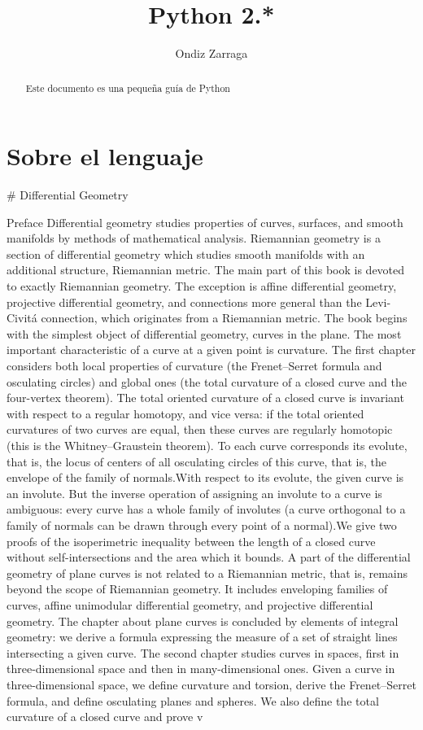 \documentclass[a4paper,10pt]{article}
\title{Python 2.*}
\author{Ondiz Zarraga}
\begin{document}
\maketitle

\begin{abstract}
Este documento es una pequeña guía de Python 
\end{abstract}

\tableofcontents

\section{Sobre el lenguaje}

# Differential Geometry

Preface
Differential geometry studies properties of curves, surfaces, and smooth manifolds
by methods of mathematical analysis. Riemannian geometry is a section of differential
geometry which studies smooth manifolds with an additional structure,
Riemannian metric. The main part of this book is devoted to exactly Riemannian
geometry. The exception is affine differential geometry, projective differential
geometry, and connections more general than the Levi-Civitá connection, which
originates from a Riemannian metric.
The book begins with the simplest object of differential geometry, curves in the
plane. The most important characteristic of a curve at a given point is curvature.
The first chapter considers both local properties of curvature (the Frenet–Serret
formula and osculating circles) and global ones (the total curvature of a closed
curve and the four-vertex theorem). The total oriented curvature of a closed curve
is invariant with respect to a regular homotopy, and vice versa: if the total oriented
curvatures of two curves are equal, then these curves are regularly homotopic (this
is the Whitney–Graustein theorem). To each curve corresponds its evolute, that is,
the locus of centers of all osculating circles of this curve, that is, the envelope of the
family of normals.With respect to its evolute, the given curve is an involute. But the
inverse operation of assigning an involute to a curve is ambiguous: every curve has
a whole family of involutes (a curve orthogonal to a family of normals can be drawn
through every point of a normal).We give two proofs of the isoperimetric inequality
between the length of a closed curve without self-intersections and the area which
it bounds. A part of the differential geometry of plane curves is not related to a
Riemannian metric, that is, remains beyond the scope of Riemannian geometry. It
includes enveloping families of curves, affine unimodular differential geometry, and
projective differential geometry. The chapter about plane curves is concluded by
elements of integral geometry: we derive a formula expressing the measure of a set
of straight lines intersecting a given curve.
The second chapter studies curves in spaces, first in three-dimensional space
and then in many-dimensional ones. Given a curve in three-dimensional space, we
define curvature and torsion, derive the Frenet–Serret formula, and define osculating
planes and spheres. We also define the total curvature of a closed curve and prove
v
\end{document}

